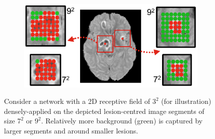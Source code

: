 
\begin{figure}[!h]
\centering
\begin{subfigure}[b]{0.5\textwidth}
\centering
	\includegraphics[clip=true, trim=0pt 0pt 0pt 0pt, width=1.0\textwidth]{figures/methodSection/denseTraining/segmentsVisual.png}
\end{subfigure}

\caption{Consider a network with a 2D receptive field of $3^2$ (for illustration) densely-applied on the depicted lesion-centred image segments of size $7^2$ or $9^2$. Relatively more background (green) is captured by larger segments and around smaller lesions.}
\label{fig:segmentsVisual}
\end{figure}